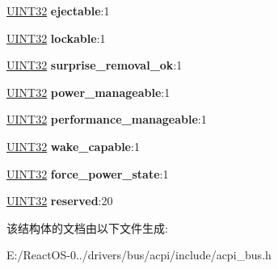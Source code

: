 \begin{DoxyCompactItemize}
\hyperlink{_processor_bind_8h_ae1e6edbbc26d6fbc71a90190d0266018}{U\+I\+N\+T32} {\bfseries ejectable}\+:1
\item 
\mbox{\label{structacpi__device__flags_a4eb42c94affd31018f304e730c8ffc93}} 
\hyperlink{_processor_bind_8h_ae1e6edbbc26d6fbc71a90190d0266018}{U\+I\+N\+T32} {\bfseries lockable}\+:1
\item 
\mbox{\label{structacpi__device__flags_aa72a5f9d083cf6a0781acf501d08dd6c}} 
\hyperlink{_processor_bind_8h_ae1e6edbbc26d6fbc71a90190d0266018}{U\+I\+N\+T32} {\bfseries surprise\+\_\+removal\+\_\+ok}\+:1
\item 
\mbox{\label{structacpi__device__flags_adb999f4e772df5b76cfc9df0994306b0}} 
\hyperlink{_processor_bind_8h_ae1e6edbbc26d6fbc71a90190d0266018}{U\+I\+N\+T32} {\bfseries power\+\_\+manageable}\+:1
\item 
\mbox{\label{structacpi__device__flags_a8228a2537cc7454191f98fa32ce62dc9}} 
\hyperlink{_processor_bind_8h_ae1e6edbbc26d6fbc71a90190d0266018}{U\+I\+N\+T32} {\bfseries performance\+\_\+manageable}\+:1
\item 
\mbox{\label{structacpi__device__flags_a512a6cce1bed032b6edc2b8bbb8152e7}} 
\hyperlink{_processor_bind_8h_ae1e6edbbc26d6fbc71a90190d0266018}{U\+I\+N\+T32} {\bfseries wake\+\_\+capable}\+:1
\item 
\mbox{\label{structacpi__device__flags_a17f487a3372d43950b2587d2ceeac346}} 
\hyperlink{_processor_bind_8h_ae1e6edbbc26d6fbc71a90190d0266018}{U\+I\+N\+T32} {\bfseries force\+\_\+power\+\_\+state}\+:1
\item 
\mbox{\label{structacpi__device__flags_a9937c42be330ea9e57f88691a0f0c7de}} 
\hyperlink{_processor_bind_8h_ae1e6edbbc26d6fbc71a90190d0266018}{U\+I\+N\+T32} {\bfseries reserved}\+:20
\end{DoxyCompactItemize}


该结构体的文档由以下文件生成\+:\begin{DoxyCompactItemize}
\item 
E\+:/\+React\+O\+S-\/0../drivers/bus/acpi/include/acpi\+\_\+bus.\+h\end{DoxyCompactItemize}
